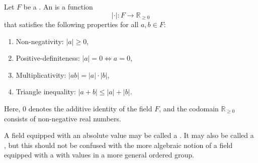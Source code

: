 \begin{definition} \label{definition:absolute_value_on_a_field}
    Let \( F \) be a . 
    An  is a function 
    \[
    | \cdot | : F \to \mathbb{R}_{\geq 0}
    \]
    that satisfies the following properties for all \( a, b \in F \):

    \begin{enumerate}
        \item Non-negativity: \( |a| \geq 0 \),
        \item Positive-definiteness: \( |a| = 0 \iff a = 0 \),
        \item Multiplicativity: \( |ab| = |a| \cdot |b| \),
        \item Triangle inequality: \( |a + b| \leq |a| + |b| \).
    \end{enumerate}

    Here, \( 0 \) denotes the additive identity of the field \( F \), and the codomain \( \mathbb{R}_{\geq 0} \) consists of non-negative real numbers.

    A field equipped with an absolute value may be called a . It may also be called a , but this should not be confused with the more algebraic notion of a field equipped with a  with values in a more general ordered group.
\end{definition}